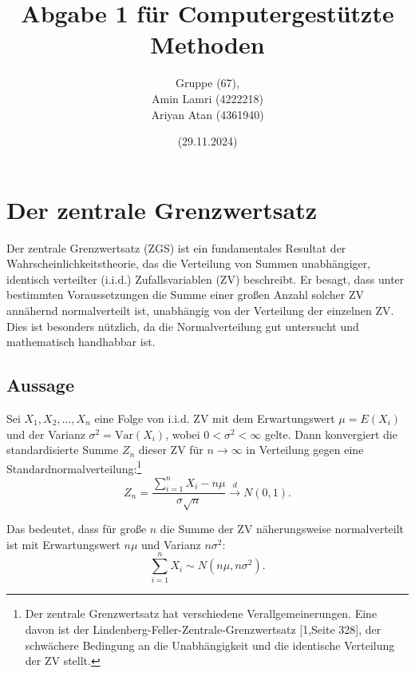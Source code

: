 \documentclass[a4paper,12pt]{article}
\begin{document}
\title{\huge\textbf{Abgabe 1 für Computergestützte Methoden}}
\author{Gruppe (67),\vspace{3,5cm}\\Amin Lamri (4222218) \\ Ariyan Atan (4361940)} 
\date{(29.11.2024)}


\maketitle
\thispagestyle{empty}


\newpage
\thispagestyle{empty}
\tableofcontents





\newpage
\section{Der zentrale Grenzwertsatz}

Der zentrale Grenzwertsatz (ZGS) ist ein fundamentales Resultat der Wahrscheinlichkeitstheorie, das die Verteilung von Summen unabhängiger, identisch verteilter (i.i.d.) Zufallsvariablen (ZV) beschreibt. Er besagt, dass unter bestimmten Voraussetzungen die Summe einer großen Anzahl solcher ZV annähernd normalverteilt ist, unabhängig von der Verteilung der einzelnen ZV. Dies ist besonders nützlich, da die Normalverteilung gut untersucht und mathematisch handhabbar ist.

\subsection{Aussage}

Sei $X_1, X_2, \ldots, X_n$ eine Folge von i.i.d. ZV mit dem Erwartungswert $\mu = E(X_i)$ und der Varianz $\sigma^2 = \text{Var}(X_i)$, wobei $0 < \sigma^2 < \infty$ gelte. Dann konvergiert die standardisierte Summe $Z_n$ dieser ZV für $n \to \infty$ in Verteilung gegen eine Standardnormalverteilung:\footnote{Der zentrale Grenzwertsatz hat verschiedene Verallgemeinerungen. Eine davon ist der Lindenberg-Feller-Zentrale-Grenzwertsatz [1,Seite 328], der schwächere Bedingung an die Unabhängigkeit und die identische Verteilung der ZV stellt.}
\[
Z_n = \frac{\sum_{i=1}^n X_i - n\mu}{\sigma\sqrt{n}} \xrightarrow{d} N(0,1).
\]

Das bedeutet, dass für große $n$ die Summe der ZV näherungsweise normalverteilt ist mit Erwartungswert $n\mu$ und Varianz $n\sigma^2$:
\[
\sum_{i=1}^n X_i \sim N(n\mu, n\sigma^2).
\]
\end{document}

